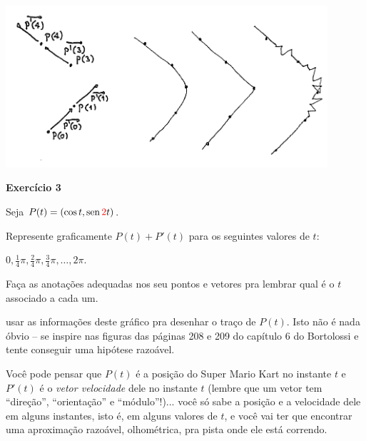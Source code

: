 \documentclass[oneside,12pt]{article}
\begin{document}
\bsk

\includegraphics[height=6cm]{2021-1-C3/20210618_trajetorias.pdf}

\newpage


\vspace*{-0.75cm}

{\bf Exercício 3}

Seja $P(t) = (\cos t, \sen \ColorRed{2}t)$.

Represente graficamente $P(t)+P'(t)$ para os seguintes valores de $t$:

$0, \frac14π, \frac24π, \frac34π, \ldots, 2π$.

Faça as anotações adequadas nos seu pontos e vetores pra lembrar qual
é o $t$ associado a cada um.

\msk

 usar as informações deste gráfico pra desenhar o
traço de $P(t)$. Isto não é nada óbvio -- se inspire nas figuras das
páginas 208 e 209 do capítulo 6 do Bortolossi e tente conseguir uma
hipótese razoável.

\msk

Você pode pensar que $P(t)$ é a posição do Super Mario Kart no
instante $t$ e $P'(t)$ é o {\sl vetor velocidade} dele no instante $t$
(lembre que um vetor tem ``direção'', ``orientação'' e ``módulo''!)...
você só sabe a posição e a velocidade dele em alguns instantes, isto
é, em alguns valores de $t$, e você vai ter que encontrar uma
aproximação razoável, olhométrica, pra pista onde ele está correndo.



\newpage

\end{document}
